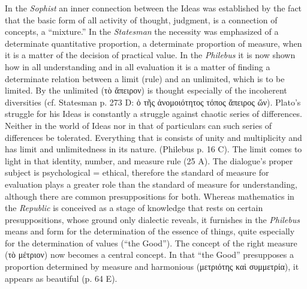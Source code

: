 \documentclass[12pt,a4paper,openany]{book}
\newcommand{\opage}[1]{\marginnote{\footnotesize\textit{[#1]}}}
\begin{document}
In the \textit{Sophist} an inner connection between the Ideas
was established by the fact that the basic form of all activity of thought, judgment,
is a connection of concepts, a ``mixture.''  In
the \textit{Statesman} the necessity was emphasized of a determinate
quantitative proportion, a determinate proportion of measure, when it is a matter of the decision
of practical value.  In the \textit{Philebus} it is now shown how
in all understanding and in all evaluation it is a matter of
finding a determinate relation between a limit (rule) and an
unlimited, which is to be limited.  By the unlimited
(τὸ ἄπειρον) is thought especially of the incoherent diversities
(cf. Statesman p. 273 D: ὁ τῆς ἀνομοιότητος τόπος
ἄπειρος ὤν).  Plato's struggle for his Ideas is constantly a
struggle against chaotic series of differences.  Neither in the world of Ideas
nor in that of particulars can such series of differences be tolerated.
Everything that is consists of unity and multiplicity and
\setcounter{footnote}{0}%
\opage{60}has limit and unlimitedness in its nature.  (Philebus p. 16 C).
The limit comes to light in that identity, number, and
measure rule (25 A).  The dialogue's proper subject is psychological
= ethical, therefore the standard of measure for evaluation plays a
greater role than the standard of measure for understanding, although there
are common presuppositions for both.  Whereas mathematics in
the \textit{Republic} is conceived as a stage of knowledge that rests
on certain presuppositions, whose ground only dialectic
reveals, it furnishes in the \textit{Philebus} means and form for the determination
of the essence of things, quite especially for the determination
of values (``the Good'').  The concept of the right measure
(τὸ μέτριον) now becomes a central concept.  In that ``the
Good'' presupposes a proportion determined by measure and harmonious
(μετριότης καὶ συμμετρία), it appears as beautiful (p. 64 E).
\end{document}
